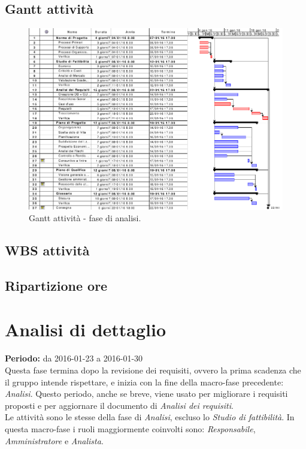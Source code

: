 \documentclass[a4paper]{report}
\begin{document}
			\subsection{Gantt attività}
				\begin{figure}[H]
					\centering
					\includegraphics[scale=0.4]{gantt-analisi}
					\caption{Gantt attività - fase di analisi.}
				\end{figure}
			\subsection{WBS attività}
			\subsection{Ripartizione ore}

		\section{Analisi di dettaglio}
			\textbf{Periodo:} da 2016-01-23 a 2016-01-30 \\
			Questa fase termina dopo la revisione dei requisiti, ovvero la prima scadenza che il gruppo intende 
			rispettare, e inizia con la fine della macro-fase precedente: \emph{Analisi}.
			Questo periodo, anche se breve, viene usato per migliorare i requisiti proposti e per aggiornare il 
			documento di \emph{Analisi dei requisiti}. \\ 
			Le attività sono le stesse della fase di \emph{Analisi}, escluso lo \emph{Studio di fattibilità}. 
			In questa macro-fase i ruoli maggiormente coinvolti sono: \emph{Responsabile}, \emph{Amministratore} 
			e \emph{Analista}.
\end{document}
